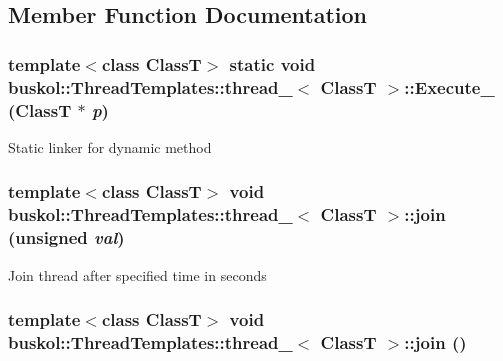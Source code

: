 \subsection{Member Function Documentation}
\hypertarget{classbuskol_1_1ThreadTemplates_1_1thread__1_a37cde0d5c6105d9194ce1cf981cf9c5a}{
\subsubsection[{Execute\_\-}]{\setlength{\rightskip}{0pt plus 5cm}template$<$class ClassT$>$ static void {\bf buskol::ThreadTemplates::thread\_}$<$ ClassT $>$::Execute\_\- (ClassT $\ast$ {\em p})}}
\label{classbuskol_1_1ThreadTemplates_1_1thread__1_a37cde0d5c6105d9194ce1cf981cf9c5a}


Static linker for dynamic method 

\hypertarget{classbuskol_1_1ThreadTemplates_1_1thread__1_a7c62551333aad740fc7b48742cdeb877}{
\subsubsection[{join}]{\setlength{\rightskip}{0pt plus 5cm}template$<$class ClassT$>$ void {\bf buskol::ThreadTemplates::thread\_}$<$ ClassT $>$::join (unsigned {\em val})}}
\label{classbuskol_1_1ThreadTemplates_1_1thread__1_a7c62551333aad740fc7b48742cdeb877}


Join thread after specified time in seconds 

\hypertarget{classbuskol_1_1ThreadTemplates_1_1thread__1_af917523b30feb06614e96371a5c198ed}{
\subsubsection[{join}]{\setlength{\rightskip}{0pt plus 5cm}template$<$class ClassT$>$ void {\bf buskol::ThreadTemplates::thread\_}$<$ ClassT $>$::join ()}}
\label{classbuskol_1_1ThreadTemplates_1_1thread__1_af917523b30feb06614e96371a5c198ed}


